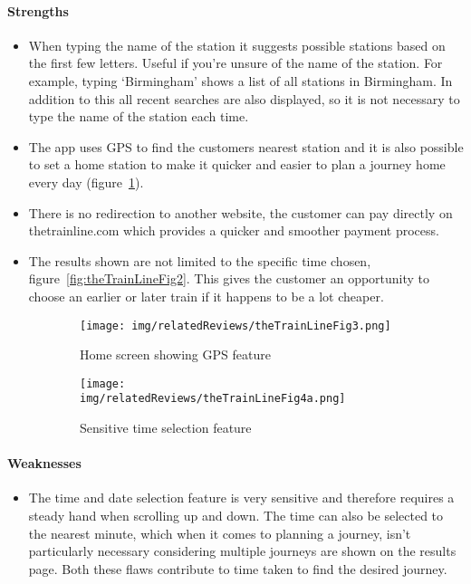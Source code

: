 \paragraph{Strengths}

\begin{itemize}
	\item When typing the name of the station it suggests possible stations
		based on the first few letters. Useful if you're unsure of the name of
		the station. For example, typing `Birmingham' shows a list of all
		stations in Birmingham. In addition to this all recent searches are
		also displayed, so it is not necessary to type the name of the station
		each time.
	\item The app uses GPS to find the customers nearest station and it is also
		possible to set a home station to make it quicker and easier to plan a
		journey home every day (figure~\ref{fig:thetrainline3}).
	\item There is no redirection to another website, the customer can pay
		directly on thetrainline.com which provides a quicker and smoother
		payment process.
	\item The results shown are not limited to the specific time chosen,
		figure~\ref{fig:theTrainLineFig2}. This gives the customer an
		opportunity to choose an earlier or later train if it happens to be a
		lot cheaper.
\end{itemize}
\begin{figure}[htbp]
	\centering
	\begin{subfigure}[b]{0.33\textwidth}
		\texttt{[image: img/relatedReviews/theTrainLineFig3.png]}
		\caption{Home screen showing GPS feature}
	\end{subfigure}%
	\qquad
	\begin{subfigure}[b]{0.33\textwidth}
		\texttt{[image: img/relatedReviews/theTrainLineFig4a.png]}
		\caption{Sensitive time selection feature}
	\end{subfigure}
	\caption{}\label{fig:thetrainline3}
\end{figure}

\paragraph{Weaknesses}
\begin{itemize}
	\item The time and date selection feature is very sensitive and therefore
		requires a steady hand when scrolling up and down. The time can also be
		selected to the nearest minute, which when it comes to planning a
		journey, isn't particularly necessary considering multiple journeys are
		shown on the results page. Both these flaws contribute to time taken to
		find the desired journey.
\end{itemize}

